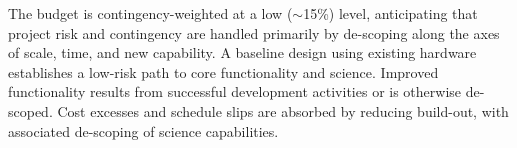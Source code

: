 \documentclass[preprint]{aastex}
\begin{document}
The budget is contingency-weighted at a low ($\sim$15\%) level, anticipating that project 
risk and contingency are handled primarily by de-scoping along the axes of scale, time, and new capability.  
A baseline design using
existing hardware establishes a low-risk path to core functionality and science.  Improved functionality
results from successful development activities or is otherwise de-scoped.
Cost excesses and schedule slips are absorbed by reducing
build-out, with associated de-scoping of science capabilities.


\clearpage
\setcounter{page}{1}
\thispagestyle{empty}
%
%

%

\end{document}
